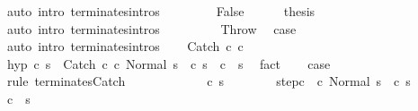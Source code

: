 \begin{isabellebody}
\ {\isacharparenleft}auto\ intro{\isacharcolon}\ terminates{\isachardot}intros{\isacharparenright}\isanewline
\ \ \isamarkupfalse%
\isanewline
\ \ \ \ \isamarkupfalse%
\ False\isanewline
\ \ \ \ \isamarkupfalse%
\ {\isacharquery}thesis\isanewline
\ \ \ \ \ \ \isamarkupfalse%
\ {\isacharparenleft}auto\ intro{\isacharcolon}\ terminates{\isachardot}intros{\isacharparenright}\isanewline
\ \ \isamarkupfalse%
\isanewline
{}\isamarkupfalse%
\ \ \isanewline
\ \ \isamarkupfalse%
\ Throw\ \isamarkupfalse%
\ {\isacharquery}case\ \isamarkupfalse%
\ {\isacharparenleft}auto\ intro{\isacharcolon}\ terminates{\isachardot}intros{\isacharparenright}\isanewline
{}\isamarkupfalse%
\isanewline
\ \ \isamarkupfalse%
\ {\isacharparenleft}Catch\ c\ c\isanewline
\ \ \isamarkupfalse%
\ hyp{\isacharcolon}\ {\isachardoublequoteopen}{\isasymAnd}c{\isacharprime}\ s{\isacharprime}{\isachardot}\ {\isasymGamma}{\isasymturnstile}\ {\isacharparenleft}Catch\ c\ c\ Normal\ s{\isacharparenright}\ {\isasymrightarrow}\ {\isacharparenleft}c{\isacharprime}{\isacharcomma}\ s{\isacharprime}{\isacharparenright}\ {\isasymLongrightarrow}\ {\isasymGamma}{\isasymturnstile}c{\isacharprime}\ {\isasymdown}\ s{\isacharprime}{\isachardoublequoteclose}\ \isamarkupfalse%
\ fact\isanewline
\ \ \isamarkupfalse%
\ {\isacharquery}case\isanewline
\ \ \isamarkupfalse%
\ {\isacharparenleft}rule\ terminates{\isachardot}Catch{\isacharparenright}\isanewline
\ \ \ \ \isacommand{{\isacharbraceleft}}\isamarkupfalse%
\isanewline
\ \ \ \ \ \ \isamarkupfalse%
\ c{\isacharprime}\ s{\isacharprime}\isanewline
\ \ \ \ \ \ \isamarkupfalse%
\ step{\isacharunderscore}c\ {\isachardoublequoteopen}{\isasymGamma}{\isasymturnstile}\ {\isacharparenleft}c\ Normal\ s{\isacharparenright}\ {\isasymrightarrow}\ {\isacharparenleft}c{\isacharprime}{\isacharcomma}\ s{\isacharprime}{\isacharparenright}{\isachardoublequoteclose}\isanewline
\ \ \ \ \ \ \isamarkupfalse%
\ {\isachardoublequoteopen}{\isasymGamma}{\isasymturnstile}c{\isacharprime}\ {\isasymdown}\ s{\isacharprime}{\isachardoublequoteclose}\isanewline
\ \ \ \ \ \ \isamarkupfalse%

\end{isabellebody}

